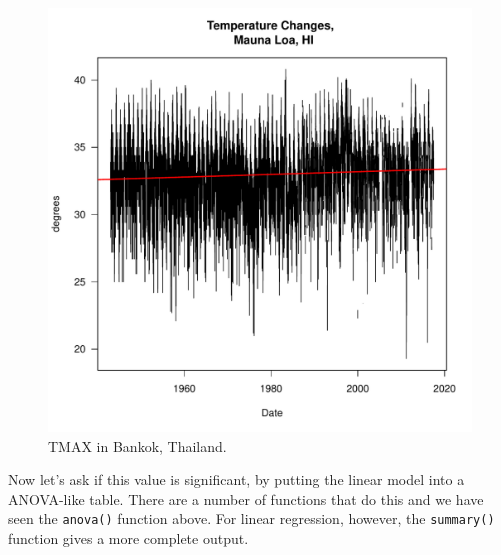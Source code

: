 \documentclass{article}\usepackage[]{graphicx}\usepackage[]{color}
\makeatletter
\def\maxwidth{ %
  \ifdim\Gin@nat@width>\linewidth
    \linewidth
  \else
    \Gin@nat@width
  \fi
}
\newenvironment{knitrout}{}{} %
\makeatother
\begin{document}
\begin{figure}
\label{fig:xxtest}
\caption{TMAX in Bankok, Thailand.}
\begin{knitrout}
\color{fgcolor}
\includegraphics[width=\maxwidth]{figure/unnamed-chunk-15-1} 

\end{knitrout}
\end{figure}

Now let's ask if this value is significant, by putting the linear model into a ANOVA-like table. There are a number of functions that do this and we have seen the \texttt{anova()} function above. For linear regression, however, the \texttt{summary()} function gives a more complete output.
\end{document}
